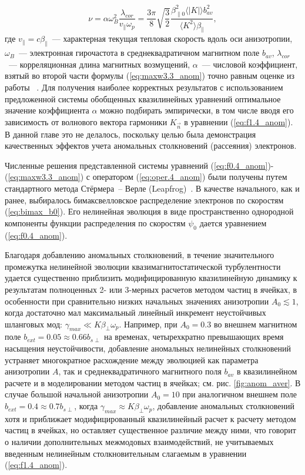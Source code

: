\begin{equation}
\nu=\alpha\omega_B^2\frac{\lambda_{cor}}{v_{\|}\omega_p}=\frac{3\pi}{8}\sqrt{\frac32}\frac{\beta_{\|0}^2\langle |K|\rangle b_{av}^2}{\langle K^2\rangle\beta_{\|}},
\label{eq:anom_collisions}
\end{equation}
где $v_{\|}=c\beta_{\|}$~--- характерная текущая тепловая скорость вдоль оси анизотропии, $\omega_B$~--- электронная гирочастота в среднеквадратичном магнитном поле $b_{av}$, $\lambda_{cor}$~--- корреляционная длина магнитных возмущений, $\alpha$~--- числовой коэффициент, взятый во второй части формулы (\ref{eq:maxw3.3_anom}) точно равным оценке из работы ~\cite{Medvedev2017}. Для получения наиболее корректных результатов с использованием предложенной системы обобщенных квазилинейных уравнений оптимальное значение коэффициента $\alpha$ можно подбирать эмпирически, в том числе вводя его зависимость от волнового вектора гармоники $K_{\vec{n}}$ в уравнении (\ref{eq:f1.4_anom}). В данной главе это не делалось, поскольку целью была демонстрация качественных эффектов учета аномальных столкновений (рассеяния) электронов.

Численные решения представленной системы уравнений (\ref{eq:f0.4_anom})-(\ref{eq:maxw3.3_anom}) с оператором (\ref{eq:oper.4_anom}) были получены путем стандартного метода Стёрмера~-- Верле (Leapfrog)~\cite{Birdsall2018}.
В качестве начального, как и ранее, выбиралось бимаксвелловское распределение электронов по скоростям (\ref{eq:bimax_b0}). Его нелинейная эволюция в виде пространственно однородной компоненты функции распределения по скоростям $\psi_0$ дается уравнением (\ref{eq:f0.4_anom}).

Благодаря добавлению аномальных столкновений, в течение значительного промежутка нелинейной эволюции квазимагнитостатической турбулентности удается существенно приблизить модифицированную квазилинейную динамику к результатам полноценных 2- или 3-мерных расчетов методом частиц в ячейках, в особенности при сравнительно низких начальных значениях анизотропии $A_0\lesssim1$, когда достаточно мал максимальный линейный инкремент неустойчивых шланговых мод: $\gamma_{max}\ll K\beta_\perp \omega_p$.
Например, при $A_0=0.3$ во внешнем магнитном поле $b_{ext}=0.05\approx0.66b_{s\perp}$ на временах, четырехкратно превышающих время насыщения неустойчивости, добавление аномальных нелинейных столкновений устраняет многократное расхождение между эволюцией как параметра анизотропии $A$, так и среднеквадратичного магнитного поля $b_{av}$ в квазилинейном расчете и в моделировании методом частиц в ячейках; см. рис. \ref{fig:anom_aver}. В случае большой начальной анизотропии $A_0=10$ при аналогичном внешнем поле $b_{ext}=0.4\approx0.7b_{s\perp}$, когда $\gamma_{max}\approx K\beta_\perp \omega_p$, добавление аномальных столкновений хотя и приближает модифицированный квазилинейный расчет к расчету методом частиц в ячейках, но оставляет существенное различие между ними, что говорит о наличии дополнительных межмодовых взаимодействий, не учитываемых введенным нелинейным столкновительным слагаемым в уравнении (\ref{eq:f1.4_anom}).


